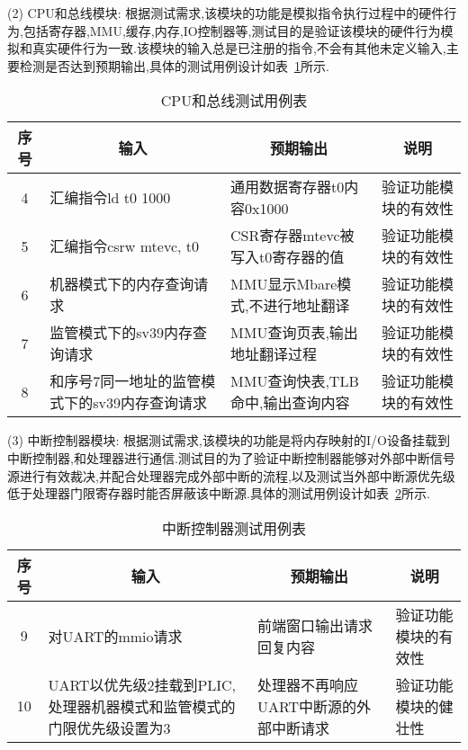 (2) CPU和总线模块: 根据测试需求,该模块的功能是模拟指令执行过程中的硬件行为,包括寄存器,MMU,缓存,内存,IO控制器等,测试目的是验证该模块的硬件行为模拟和真实硬件行为一致.该模块的输入总是已注册的指令,不会有其他未定义输入,主要检测是否达到预期输出,具体的测试用例设计如表~\ref{tab:test2}所示.
\begin{table}[h]
    \centering
    \caption{CPU和总线测试用例表}
    \label{tab:test2}
    \begin{tabular}{clll}
      \toprule
      \multicolumn{1}{c}{序号} & \multicolumn{1}{c}{输入} & \multicolumn{1}{c}{预期输出} &\multicolumn{1}{c}{说明}\\
      \midrule
  4	& \multicolumn{1}{m{3.5cm}}{汇编指令ld t0 1000} & \multicolumn{1}{m{3.5cm}}{通用数据寄存器t0内容0x1000} & \multicolumn{1}{m{3.5cm}}{验证功能模块的有效性}\\
  \hline
  5	& \multicolumn{1}{m{3.5cm}}{汇编指令csrw mtevc, t0} & \multicolumn{1}{m{3.5cm}}{CSR寄存器mtevc被写入t0寄存器的值} & \multicolumn{1}{m{3.5cm}}{验证功能模块的有效性}\\
  \hline
  6	& \multicolumn{1}{m{3.5cm}}{机器模式下的内存查询请求} & \multicolumn{1}{m{3.5cm}}{MMU显示Mbare模式,不进行地址翻译} & \multicolumn{1}{m{3.5cm}}{验证功能模块的有效性}\\
  \hline
  7	& \multicolumn{1}{m{3.5cm}}{监管模式下的sv39内存查询请求} & \multicolumn{1}{m{3.5cm}}{MMU查询页表,输出地址翻译过程} & \multicolumn{1}{m{3.5cm}}{验证功能模块的有效性}\\
  \hline
  8	& \multicolumn{1}{m{3.5cm}}{和序号7同一地址的监管模式下的sv39内存查询请求} & \multicolumn{1}{m{3.5cm}}{MMU查询快表,TLB命中,输出查询内容} & \multicolumn{1}{m{3.5cm}}{验证功能模块的有效性}\\
      \bottomrule
    \end{tabular}
\end{table}

(3) 中断控制器模块: 根据测试需求,该模块的功能是将内存映射的I/O设备挂载到中断控制器,和处理器进行通信.测试目的为了验证中断控制器能够对外部中断信号源进行有效裁决,并配合处理器完成外部中断的流程,以及测试当外部中断源优先级低于处理器门限寄存器时能否屏蔽该中断源.具体的测试用例设计如表~\ref{tab:test3}所示.
\begin{table}[h]
    \centering
    \caption{中断控制器测试用例表}
    \label{tab:test3}
    \begin{tabular}{clll}
      \toprule
      \multicolumn{1}{c}{序号} & \multicolumn{1}{c}{输入} & \multicolumn{1}{c}{预期输出} &\multicolumn{1}{c}{说明}\\
      \midrule
  9	& \multicolumn{1}{m{3.5cm}}{对UART的mmio请求} & \multicolumn{1}{m{3.5cm}}{前端窗口输出请求回复内容} & \multicolumn{1}{m{3.5cm}}{验证功能模块的有效性}\\
  \hline
  10	& \multicolumn{1}{m{3.5cm}}{UART以优先级2挂载到PLIC,处理器机器模式和监管模式的门限优先级设置为3} & \multicolumn{1}{m{3.5cm}}{处理器不再响应UART中断源的外部中断请求} & \multicolumn{1}{m{3.5cm}}{验证功能模块的健壮性}\\
  \bottomrule
    \end{tabular}
\end{table}


